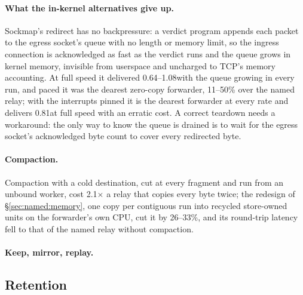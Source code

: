 \paragraph{What the in-kernel alternatives give up.} Sockmap's redirect has no backpressure: a
verdict program appends each packet to the egress socket's queue with no length or memory
limit, so the ingress connection is acknowledged as fast as the verdict runs and the queue
grows in kernel memory, invisible from userspace and uncharged to TCP's memory accounting.
At full speed it delivered 0.64--1.08\GBs with the queue growing in every run, and paced it was
the dearest zero-copy forwarder, 11--50\% over the named relay; with the interrupts pinned it
is the dearest forwarder at every rate and delivers 0.81\GBs at full speed with an erratic
cost. %
A correct teardown needs a workaround: the only way to know the queue is drained is to wait for
the egress socket's acknowledged byte count to cover every redirected byte.

\paragraph{Compaction.} Compaction with a cold destination, cut at every fragment and run from an
unbound worker, cost 2.1$\times$ a relay that copies every byte twice; the redesign of
\S\ref{sec:named:memory}, one copy per contiguous run into recycled store-owned units on the
forwarder's own CPU, cut it by 26--33\%, and its round-trip latency fell to that of the named
relay without compaction. %

\paragraph{Keep, mirror, replay.} 

\subsection{Retention}
\label{sec:eval:retention}


